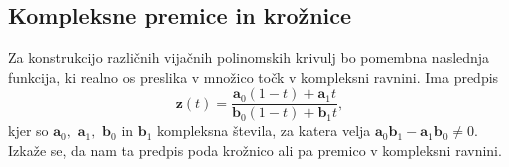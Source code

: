 \documentclass[12pt,a4paper,twoside]{article}
\theoremstyle{definition} %
\theoremstyle{plain} %
\theoremstyle{primerstyle}
\numberwithin{equation}{section}  %
\newcommand{\aV}{\mathbf{a}}
\newcommand{\bV}{\mathbf{b}}
\newcommand{\zV}{\mathbf{z}}
\begin{document}
\subsection{Kompleksne premice in krožnice}
\label{poglavje_kompleksne_premice_kroznice}

Za konstrukcijo različnih vijačnih polinomskih krivulj bo pomembna naslednja funkcija, ki realno os preslika v množico točk v kompleksni ravnini. Ima predpis
\begin{equation}
	\label{transformacija}
	\zV(t)=\frac{\aV_0(1-t)+\aV_1t}{\bV_0(1-t)+\bV_1t},
\end{equation}
kjer so $\aV_0,$ $\aV_1,$ $\bV_0$ in $\bV_1$ kompleksna števila, za katera velja $\aV_0\bV_1-\aV_1\bV_0\neq 0.$ Izkaže se, da nam ta predpis poda krožnico ali pa premico v kompleksni ravnini.%
\end{document}
